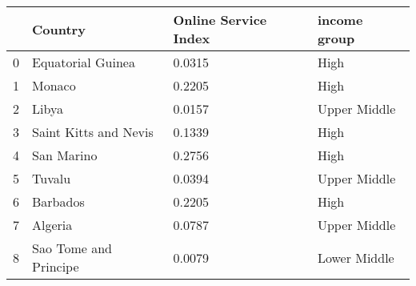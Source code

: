 \begin{tabular}{llll}
\toprule
{} &                Country & Online Service Index &  income group \\
\midrule
0 &      Equatorial Guinea &               0.0315 &          High \\
1 &                 Monaco &               0.2205 &          High \\
2 &                  Libya &               0.0157 &  Upper Middle \\
3 &  Saint Kitts and Nevis &               0.1339 &          High \\
4 &             San Marino &               0.2756 &          High \\
5 &                 Tuvalu &               0.0394 &  Upper Middle \\
6 &               Barbados &               0.2205 &          High \\
7 &                Algeria &               0.0787 &  Upper Middle \\
8 &  Sao Tome and Principe &               0.0079 &  Lower Middle \\
\bottomrule
\end{tabular}
